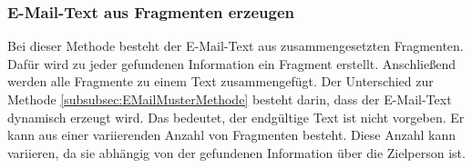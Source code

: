 		\subsubsection{E-Mail-Text aus Fragmenten erzeugen}
		\label{subsubsec:EMailTextFragment}
		Bei dieser Methode besteht der E-Mail-Text aus zusammengesetzten Fragmenten. Dafür wird zu jeder gefundenen Information ein Fragment erstellt. Anschließend werden alle Fragmente zu einem Text zusammengefügt. Der Unterschied zur Methode \ref{subsubsec:EMailMusterMethode} besteht darin, dass der E-Mail-Text dynamisch erzeugt wird. Das bedeutet, der endgültige Text ist nicht vorgeben. Er kann aus einer variierenden Anzahl von Fragmenten besteht. Diese Anzahl kann variieren, da sie abhängig von der gefundenen Information über die Zielperson ist.
		
		
		

